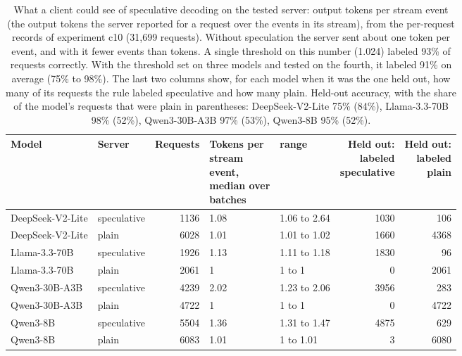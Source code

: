 \begin{table}[t]
\centering
\footnotesize
\setlength{\tabcolsep}{4pt}
\caption{What a client could see of speculative decoding on the tested server: output tokens per stream event (the output tokens the server reported for a request over the events in its stream), from the per-request records of experiment c10 (31,699 requests). Without speculation the server sent about one token per event, and with it fewer events than tokens. A single threshold on this number (1.024) labeled 93\% of requests correctly. With the threshold set on three models and tested on the fourth, it labeled 91\% on average (75\% to 98\%). The last two columns show, for each model when it was the one held out, how many of its requests the rule labeled speculative and how many plain. Held-out accuracy, with the share of the model's requests that were plain in parentheses: DeepSeek-V2-Lite 75\% (84\%), Llama-3.3-70B 98\% (52\%), Qwen3-30B-A3B 97\% (53\%), Qwen3-8B 95\% (52\%).}\label{tab:speculation_detect}
\begin{tabular}{llrllrr}
\toprule
Model & Server & Requests & \makecell[l]{Tokens per\\stream\\event,\\median over\\batches} & range & \makecell[r]{Held out:\\labeled\\speculative} & \makecell[r]{Held out:\\labeled\\plain} \\
\midrule
DeepSeek-V2-Lite & speculative & 1136 & 1.08 & 1.06 to 2.64 & 1030 & 106 \\
DeepSeek-V2-Lite & plain & 6028 & 1.01 & 1.01 to 1.02 & 1660 & 4368 \\
Llama-3.3-70B & speculative & 1926 & 1.13 & 1.11 to 1.18 & 1830 & 96 \\
Llama-3.3-70B & plain & 2061 & 1 & 1 to 1 & 0 & 2061 \\
Qwen3-30B-A3B & speculative & 4239 & 2.02 & 1.23 to 2.06 & 3956 & 283 \\
Qwen3-30B-A3B & plain & 4722 & 1 & 1 to 1 & 0 & 4722 \\
Qwen3-8B & speculative & 5504 & 1.36 & 1.31 to 1.47 & 4875 & 629 \\
Qwen3-8B & plain & 6083 & 1.01 & 1 to 1.01 & 3 & 6080 \\
\bottomrule
\end{tabular}
\end{table}
